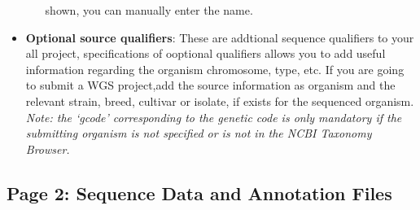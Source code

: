 \begin{itemize}
\begin{itemize}
 		shown, you can manually enter the name.
	\end{itemize}
  \item \textbf{Optional source qualifiers}: These are addtional sequence
  qualifiers to your all project, specifications of ooptional qualifiers allows
  you to add useful information regarding the organism chromosome, type, etc.
  If you are going to submit a WGS project,add the source information as
  organism and the relevant strain, breed, cultivar or isolate, if exists
  for the sequenced organism.
  \textit{Note: the `gcode' corresponding to the genetic code is only mandatory
  if the submitting organism is not specified or is not in the  NCBI Taxonomy Browser.}
\end{itemize}


\subsection {Page 2: Sequence Data and Annotation Files}
